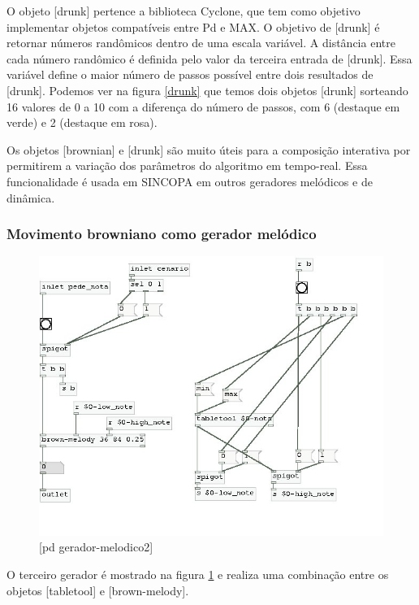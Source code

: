 \documentclass{ppgmus}
\begin{document}
O objeto [drunk] pertence a biblioteca Cyclone, que tem como objetivo
implementar objetos compatíveis entre Pd e MAX. O objetivo de [drunk] é
retornar números randômicos dentro de uma escala variável. A distância
entre cada número randômico é definida pelo valor da terceira entrada
de [drunk]. Essa variável define o maior número de passos possível entre 
dois resultados de [drunk]. Podemos ver na figura \ref{drunk} que temos
dois objetos [drunk] sorteando 16 valores de 0 a 10 com a diferença do
número de passos, com 6 (destaque em verde) e 2 (destaque em rosa).

Os objetos [brownian] e [drunk] são muito úteis para a composição 
interativa por permitirem a variação dos parâmetros do algoritmo
em tempo-real. Essa funcionalidade é usada em SINCOPA em outros geradores
melódicos e de dinâmica.

\subsubsection{Movimento browniano como gerador melódico}


\begin{figure}
\includegraphics[scale=.6]{gera-melodico2}
\caption{[pd gerador-melodico2]}
\label{gera-melodico2}
\end{figure}  


O terceiro gerador é mostrado na figura \ref{gera-melodico2} e
realiza uma combinação entre os objetos [tabletool] e [brown-melody].
\end{document}
